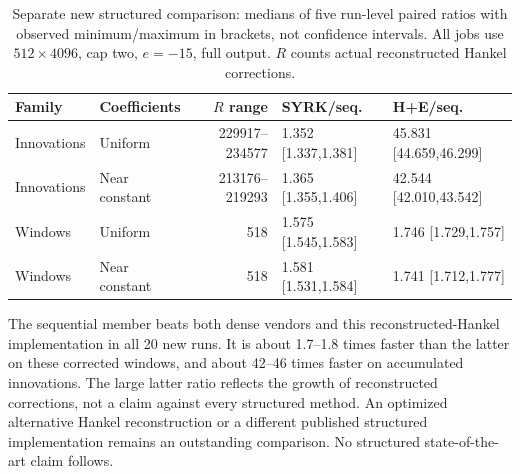 \begin{table}[h]
\centering\footnotesize\setlength{\tabcolsep}{3pt}
\begin{tabular}{llrll}
\toprule
Family & Coefficients & $R$ range & SYRK/seq. & H+E/seq. \\
\midrule
Innovations & Uniform & 229917--234577 & 1.352 [1.337,1.381] & 45.831 [44.659,46.299] \\
Innovations & Near constant & 213176--219293 & 1.365 [1.355,1.406] & 42.544 [42.010,43.542] \\
Windows & Uniform & 518 & 1.575 [1.545,1.583] & 1.746 [1.729,1.757] \\
Windows & Near constant & 518 & 1.581 [1.531,1.584] & 1.741 [1.712,1.777] \\
\bottomrule
\end{tabular}
\caption{Separate new structured comparison: medians of five run-level paired ratios with observed minimum/maximum in brackets, not confidence intervals. All jobs use $512\times4096$, cap two, $e=-15$, full output. $R$ counts actual reconstructed Hankel corrections.}
\label{tab:special}
\end{table}
The sequential member beats both dense vendors and this reconstructed-Hankel implementation in all 20 new runs. It is about 1.7--1.8 times faster than the latter on these corrected windows, and about 42--46 times faster on accumulated innovations. The large latter ratio reflects the growth of reconstructed corrections, not a claim against every structured method. An optimized alternative Hankel reconstruction or a different published structured implementation remains an outstanding comparison. No structured state-of-the-art claim follows.
